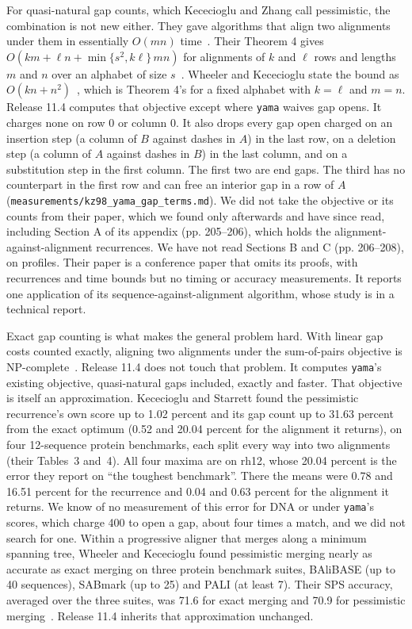 \documentclass[11pt,letterpaper]{article}
\newcommand{\code}[1]{\texttt{#1}}
\begin{document}
For quasi-natural gap counts, which Kececioglu and Zhang call pessimistic, the combination is not new either. They
gave algorithms that align two alignments under them in essentially $O(mn)$ time~\cite{kececioglu1998}. Their
Theorem 4 gives $O(km + \ell n + \min\{s^2, k\ell\}\,mn)$ for alignments of $k$ and $\ell$ rows and lengths $m$ and
$n$ over an alphabet of size $s$~\cite{kececioglu1998}. Wheeler and Kececioglu state the bound as
$O(kn + n^2)$~\cite{wheeler2007}, which is Theorem 4's for a fixed alphabet with $k = \ell$ and $m = n$. Release 11.4 computes that objective except where
\code{yama} waives gap opens. It charges none on row 0 or column 0. It also drops every gap open charged on an insertion
step (a column of $B$ against dashes in $A$) in the last row, on a deletion step (a column of $A$ against dashes in $B$)
in the last column, and on a substitution step in the first column. The first two are end gaps. The third has no
counterpart in the first row and can free an interior gap in a row of $A$ (\code{measurements/kz98\_yama\_gap\_terms.md}).
We did not take the objective or its counts from their paper, which we found only afterwards and have since read,
including Section A of its appendix (pp. 205--206), which holds the alignment-against-alignment recurrences. We have
not read Sections B and C (pp. 206--208), on profiles. Their paper is a conference paper that omits its proofs, with recurrences and time
bounds but no timing or accuracy measurements. It reports one application of its sequence-against-alignment
algorithm, whose study is in a technical report.

Exact gap counting is what makes the general problem hard. With linear gap costs counted exactly, aligning two
alignments under the sum-of-pairs objective is NP-complete~\cite{kececioglu2004,ma2003}. Release 11.4 does not touch
that problem. It computes \code{yama}'s existing objective, quasi-natural gaps included, exactly and faster. That
objective is itself an approximation. Kececioglu and Starrett found the pessimistic recurrence's own score up to 1.02 percent and its gap count up to 31.63 percent from the exact optimum (0.52 and 20.04 percent for the alignment it returns), on four 12-sequence protein benchmarks, each split every way into two alignments (their Tables~3 and~4). All four maxima are on rh12, whose 20.04 percent is the error they report on ``the toughest benchmark''. There the means were 0.78 and 16.51 percent for the recurrence and 0.04 and 0.63 percent for the alignment it returns. We know of no measurement of this error for DNA or under \code{yama}'s scores, which charge 400 to open a gap, about four times a match, and we did not search for one. Within a progressive aligner that merges along a minimum spanning tree, Wheeler and Kececioglu found pessimistic merging nearly as accurate as exact merging on three protein benchmark suites, BAliBASE (up to 40 sequences), SABmark (up
to 25) and PALI (at least 7). Their SPS accuracy, averaged over the three suites, was 71.6 for exact merging and 70.9 for pessimistic merging~\cite{wheeler2007}. Release 11.4 inherits that approximation
unchanged.
\end{document}
